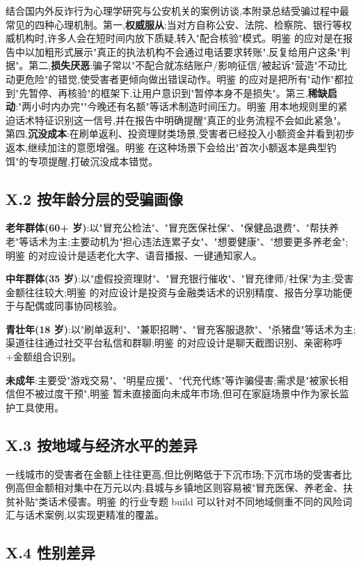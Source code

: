 \documentclass[UTF8,a4paper,12pt]{ctexart}
\begin{document}
结合国内外反诈行为心理学研究与公安机关的案例访谈,本附录总结受骗过程中最常见的四种心理机制。第一,\textbf{权威服从}:当对方自称公安、法院、检察院、银行等权威机构时,许多人会在短时间内放下质疑,转入"配合核验"模式。明鉴 的应对是在报告中以加粗形式展示"真正的执法机构不会通过电话要求转账",反复给用户这条"判据"。第二,\textbf{损失厌恶}:骗子常以"不配合就冻结账户/影响征信/被起诉"营造"不动比动更危险"的错觉,使受害者更倾向做出错误动作。明鉴 的应对是把所有"动作"都拉到"先暂停、再核验"的框架下,让用户意识到"暂停本身不是损失"。第三,\textbf{稀缺启动}:"两小时内办完""今晚还有名额"等话术制造时间压力。明鉴 用本地规则里的紧迫话术特征识别这一信号,并在报告中明确提醒"真正的业务流程不会如此紧急"。第四,\textbf{沉没成本}:在刷单返利、投资理财类场景,受害者已经投入小额资金并看到初步返本,继续加注的意愿增强。明鉴 在这种场景下会给出"首次小额返本是典型钓饵"的专项提醒,打破沉没成本错觉。

\subsection*{X.2 按年龄分层的受骗画像}

\textbf{老年群体(60+ 岁)}:以"冒充公检法"、"冒充医保社保"、"保健品退费"、"帮扶养老"等话术为主;主要动机为"担心违法连累子女"、"想要健康"、"想要更多养老金";明鉴 的对应设计是适老化大字、语音播报、一键通知家人。

\textbf{中年群体(35 岁)}:以"虚假投资理财"、"冒充银行催收"、"冒充律师/社保"为主;受害金额往往较大;明鉴 的对应设计是投资与金融类话术的识别精度、报告分享功能便于与配偶或同事协同核验。

\textbf{青壮年(18 岁)}:以"刷单返利"、"兼职招聘"、"冒充客服退款"、"杀猪盘"等话术为主;渠道往往通过社交平台私信和群聊;明鉴 的对应设计是聊天截图识别、亲密称呼+金额组合识别。

\textbf{未成年}:主要受"游戏交易"、"明星应援"、"代充代练"等诈骗侵害;需求是"被家长相信但不被过度干预",明鉴 暂未直接面向未成年市场,但可在家庭场景中作为家长监护工具使用。

\subsection*{X.3 按地域与经济水平的差异}

一线城市的受害者在金额上往往更高,但比例略低于下沉市场;下沉市场的受害者比例高但金额相对集中在万元以内;县城与乡镇地区则容易被"冒充医保、养老金、扶贫补贴"类话术侵害。明鉴 的行业专题 build 可以针对不同地域侧重不同的风险词汇与话术案例,以实现更精准的覆盖。

\subsection*{X.4 性别差异}
\end{document}
